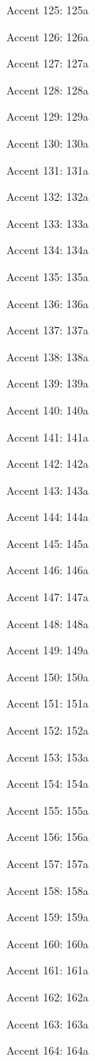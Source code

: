 Accent 125: \accent125a

Accent 126: \accent126a

Accent 127: \accent127a

Accent 128: \accent128a

Accent 129: \accent129a

Accent 130: \accent130a

Accent 131: \accent131a

Accent 132: \accent132a

Accent 133: \accent133a

Accent 134: \accent134a

Accent 135: \accent135a

Accent 136: \accent136a

Accent 137: \accent137a

Accent 138: \accent138a

Accent 139: \accent139a

Accent 140: \accent140a

Accent 141: \accent141a

Accent 142: \accent142a

Accent 143: \accent143a

Accent 144: \accent144a

Accent 145: \accent145a

Accent 146: \accent146a

Accent 147: \accent147a

Accent 148: \accent148a

Accent 149: \accent149a

Accent 150: \accent150a

Accent 151: \accent151a

Accent 152: \accent152a

Accent 153: \accent153a

Accent 154: \accent154a

Accent 155: \accent155a

Accent 156: \accent156a

Accent 157: \accent157a

Accent 158: \accent158a

Accent 159: \accent159a

Accent 160: \accent160a

Accent 161: \accent161a

Accent 162: \accent162a

Accent 163: \accent163a

Accent 164: \accent164a

